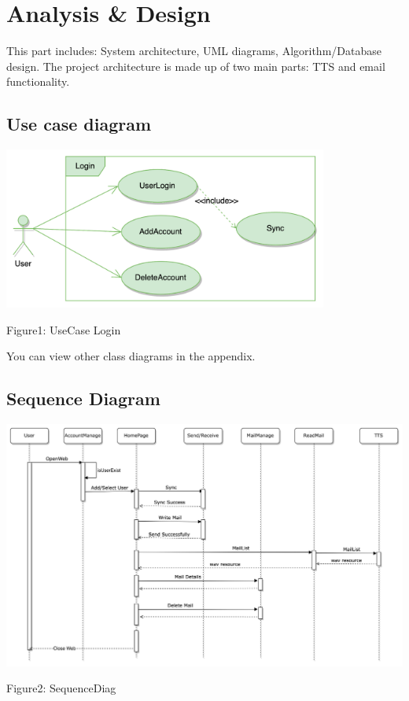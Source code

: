 \documentclass{article}
\begin{document}
\section{Analysis \& Design}
This part includes: System architecture, UML diagrams, Algorithm/Database design.
The project architecture is made up of two main parts: TTS and email functionality.

\subsection{Use case diagram}

\includegraphics[width=0.8\textwidth]{UserCase_Login.png}
\begin{center}
Figure1: UseCase Login
\end{center}
You can view other class diagrams in the appendix.
\subsection{Sequence Diagram}
\includegraphics[width=1\textwidth]{SequenceDia.png}
\begin{center}
Figure2: SequenceDiag
\end{center}
\end{document}
